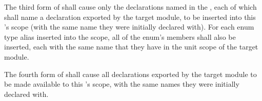 \specsubitem
The third form of  shall cause only the declarations
named in the , each of which shall name a declaration
exported by the target module, to be inserted into this 's
scope (with the same name they were initially declared with). For each enum type
alias inserted into the scope, all of the enum's members shall also be inserted,
each with the same name that they have in the unit scope of the target module.


\specsubitem
The fourth form of  shall cause all declarations
exported by the target module to be made available to this
's scope, with the same names they were initially declared
with.
